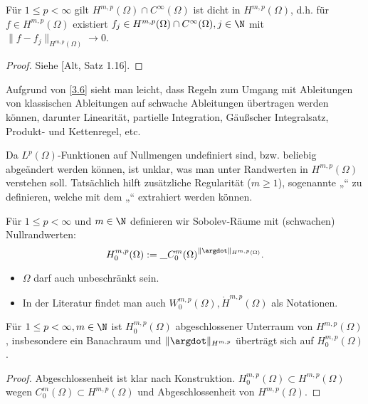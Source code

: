 \begin{st} \label{3.6}
	Für $1 \le p < \infty$ gilt $H^{m,p}(\Omega) \cap C^\infty(\Omega)$ ist dicht in $H^{m,p}(\Omega)$, d.h. für $f \in H^{m,p}(\Omega)$ existiert $f_j \in H^{m,p}(\Omega) \cap C^\infty(\Omega), j \in \N$ mit $\|f - f_j\|_{H^{m,p}(\Omega)} \to 0$.
	\begin{proof}
		Siehe [Alt, Satz 1.16].
	\end{proof}
	\begin{note}
		Aufgrund von \ref{3.6} sieht man leicht, dass Regeln zum Umgang mit Ableitungen von klassischen Ableitungen auf schwache Ableitungen übertragen werden können,
		darunter Linearität, partielle Integration, Gäußscher Integralsatz, Produkt- und Kettenregel, etc.
	\end{note}
	\begin{note}[Randwerte]
		Da $L^p(\Omega)$-Funktionen auf Nullmengen undefiniert sind, bzw. beliebig abgeändert werden können, ist unklar, was man unter Randwerten in $H^{m,p}(\Omega)$ verstehen soll.
		Tatsächlich hilft zusätzliche Regularität ($m \ge 1$), sogenannte „“ zu definieren, welche mit dem „“ extrahiert werden können.
	\end{note}
\end{st}

\begin{df} \label{3.7}
	Für $1 \le p < \infty$ und $m \in \N$ definieren wir Sobolev-Räume mit (schwachen) Nullrandwerten:
	\[
		H^{m,p}_0(\Omega)
		:= \_{C_0^m(\Omega)}^{\|\argdot\|_{H^{m,p}(\Omega)}}.
	\]
	\begin{note}
		\begin{itemize}
			\item
				$\Omega$ darf auch unbeschränkt sein.
			\item
				In der Literatur findet man auch $W_0^{m,p}(\Omega), \mathring H^{m,p}(\Omega)$ als Notationen.
		\end{itemize}
	\end{note}
\end{df}

\begin{st} \label{3.8}
	Für $1 \le p < \infty, m \in \N$ ist $H^{m,p}_0(\Omega)$ abgeschlossener Unterraum von $H^{m,p}(\Omega)$, insbesondere ein Banachraum und $\|\argdot\|_{H^{m,p}}$ überträgt sich auf $H_0^{m,p}(\Omega)$.
	\begin{proof}
		Abgeschlossenheit ist klar nach Konstruktion.
		$H^{m,p}_0(\Omega) \subset H^{m,p}(\Omega)$ wegen $C_0^m(\Omega) \subset H^{m,p}(\Omega)$ und Abgeschlossenheit von $H^{m,p}(\Omega)$.
	\end{proof}
\end{st}

